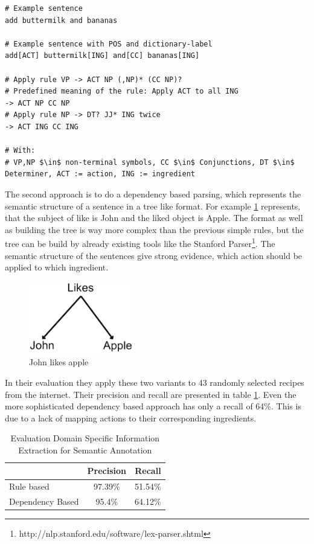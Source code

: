 \documentclass[12pt, twoside]{report}
\begin{document}
\begin{lstlisting}[frame=single, basicstyle=\footnotesize\ttfamily,caption={Rule based example}, label=lst:ruleBased, mathescape]
# Example sentence
add buttermilk and bananas

# Example sentence with POS and dictionary-label
add[ACT] buttermilk[ING] and[CC] bananas[ING]

# Apply rule VP -> ACT NP (,NP)* (CC NP)?
# Predefined meaning of the rule: Apply ACT to all ING  
-> ACT NP CC NP
# Apply rule NP -> DT? JJ* ING twice  
-> ACT ING CC ING

# With: 
# VP,NP $\in$ non-terminal symbols, CC $\in$ Conjunctions, DT $\in$ Determiner, ACT := action, ING := ingredient
\end{lstlisting}

The second approach is to do a dependency based parsing, which represents the semantic structure of a sentence in a tree like format. For example \cref{fig:johnLikesApple} represents, that the subject of like is John and the liked object is Apple.
The format as well as building the tree is way more complex than the previous simple rules, but the tree can be build by already existing tools like the Stanford Parser\footnote{http://nlp.stanford.edu/software/lex-parser.shtml}. The semantic structure of the sentences give strong evidence, which action should be applied to which ingredient.

\begin{figure}[H]
	\centering
	\includegraphics[]{Images/JohnLikesApple}
	\caption{John likes apple \parencite{GrammaBased}}
	\label{fig:johnLikesApple}
\end{figure}

In their evaluation they apply these two variants to 43 randomly selected recipes from the internet. Their precision and recall are presented in table \ref{tab:masterEval}. Even the more sophisticated dependency based approach has only a recall of 64\%. This is due to a lack of mapping actions to their corresponding ingredients.

\begin{table}[H]
	\centering
	\begin{tabular}{ l | c | r } 
		& Precision & Recall \\
		\hline
		Rule based & 97.39\% & 51.54\% \\
		Dependency Based & 95.4\% & 64.12\% \\
	\end{tabular}
	\caption{Evaluation Domain Specific Information Extraction for Semantic Annotation}
	\label{tab:masterEval}
\end{table}
\end{document}
